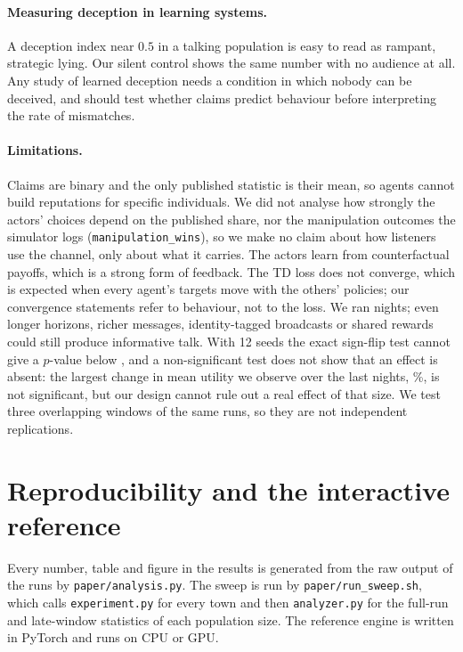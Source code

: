\documentclass[11pt]{article}
\begin{document}
\paragraph{Measuring deception in learning systems.}
A deception index near $0.5$ in a talking population is easy to read as rampant, strategic lying. Our silent control shows the same number with no audience at all. Any study of learned deception needs a condition in which nobody can be deceived, and should test whether claims predict behaviour before interpreting the rate of mismatches.

\paragraph{Limitations.}
Claims are binary and the only published statistic is their mean, so agents cannot build reputations for specific individuals. We did not analyse how strongly the actors' choices depend on the published share, nor the manipulation outcomes the simulator logs (\texttt{manipulation\_wins}), so we make no claim about how listeners use the channel, only about what it carries. The actors learn from counterfactual payoffs, which is a strong form of feedback. The TD loss does not converge, which is expected when every agent's targets move with the others' policies; our convergence statements refer to behaviour, not to the loss. We ran \rnightsLong{} nights; even longer horizons, richer messages, identity-tagged broadcasts or shared rewards could still produce informative talk. With 12 seeds the exact sign-flip test cannot give a $p$-value below \rminP, and a non-significant test does not show that an effect is absent: the largest change in mean utility we observe over the last \rnightsLate{} nights, \rmaxUtilPctLate\%, is not significant, but our design cannot rule out a real effect of that size. We test three overlapping windows of the same runs, so they are not independent replications.

\section{Reproducibility and the interactive reference}\label{sec:repro}

Every number, table and figure in the results is generated from the raw output of the runs by \texttt{paper/analysis.py}. The sweep is run by \texttt{paper/run\_sweep.sh}, which calls \texttt{experiment.py} for every town and then \texttt{analyzer.py} for the full-run and late-window statistics of each population size. The reference engine is written in PyTorch and runs on CPU or GPU.
\end{document}
